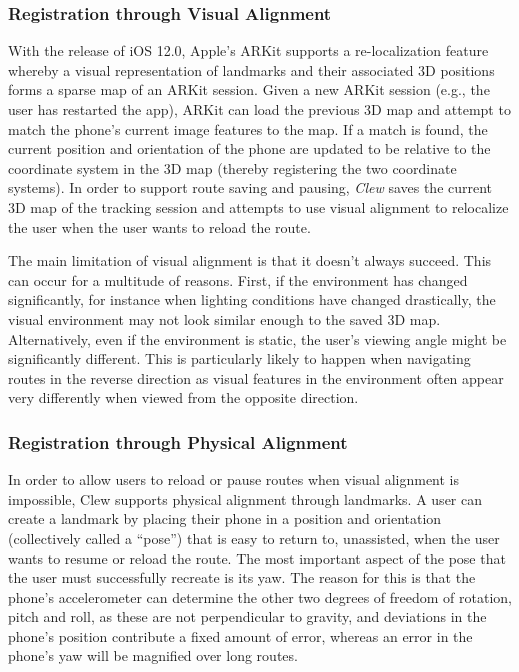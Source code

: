 \documentclass[chi_draft]{sigchi}
\begin{document}
\subsubsection{Registration through Visual Alignment}
With the release of iOS 12.0, Apple's ARKit supports a re-localization feature whereby a visual representation of landmarks and their associated 3D positions forms a sparse map of an ARKit session.  Given a new ARKit session (e.g., the user has restarted the app), ARKit can load the previous 3D map and attempt to match the phone's current image features to the map.  If a match is found, the current position and orientation of the phone are updated to be relative to the coordinate system in the 3D map (thereby registering the two coordinate systems).  In order to support route saving and pausing, \emph{Clew} saves the current 3D map of the tracking session and attempts to use visual alignment to relocalize the user when the user wants to reload the route.

The main limitation of visual alignment is that it doesn't always succeed.  This can occur for a multitude of reasons.  First, if the environment has changed significantly, for instance when lighting conditions have changed drastically, the visual environment may not look similar enough to the saved 3D map.  Alternatively, even if the environment is static, the user's viewing angle might be significantly different.  This is particularly likely to happen when navigating routes in the reverse direction as visual features in the environment often appear very differently when viewed from the opposite direction.


\subsubsection{Registration through Physical Alignment}

In order to allow users to reload or pause routes when visual alignment is impossible, Clew supports physical alignment through landmarks.  A user can create a landmark by placing their phone in a position and orientation (collectively called a ``pose'') that is easy to return to, unassisted, when the user wants to resume or reload the route.  The most important aspect of the pose that the user must successfully recreate is its yaw.  The reason for this is that the phone's accelerometer can determine the other two degrees of freedom of rotation, pitch and roll, as these are not perpendicular to gravity, and deviations in the phone's position contribute a fixed amount of error, whereas an error in the phone's yaw will be magnified over long routes.
\end{document}
